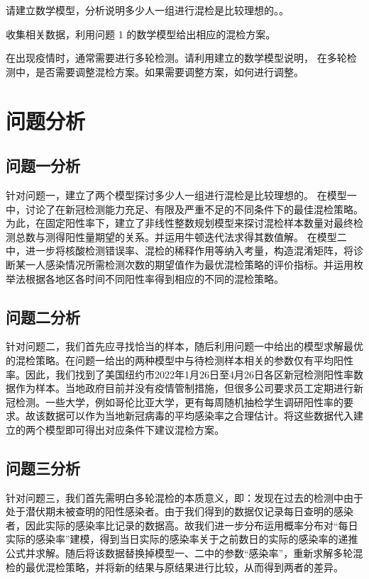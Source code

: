 \documentclass[withoutpreface,bwprint]{cumcmthesis} %
\begin{document}
 \begin{problem}
请建立数学模型，分析说明多少人一组进行混检是比较理想的。。
 \end{problem}
 \begin{problem}
收集相关数据，利用问题 1 的数学模型给出相应的混检方案。
 \end{problem}
 \begin{problem}
在出现疫情时，通常需要进行多轮检测。请利用建立的数学模型说明，
在多轮检测中，是否需要调整混检方案。如果需要调整方案，如何进行调整。
\end{problem}

\section{问题分析}
\subsection{问题一分析}
针对问题一，建立了两个模型探讨多少人一组进行混检是比较理想的。
在模型一中，讨论了在新冠检测能力充足、有限及严重不足的不同条件下的最佳混检策略。为此，在固定阳性率下，建立了非线性整数规划模型来探讨混检样本数量对最终检测总数与测得阳性量期望的关系。并运用牛顿迭代法求得其数值解。
在模型二中，进一步将核酸检测错误率、混检的稀释作用等纳入考量，构造混淆矩阵，将诊断某一人感染情况所需检测次数的期望值作为最优混检策略的评价指标。并运用枚举法根据各地区各时间不同阳性率得到相应的不同的混检策略。

\subsection{问题二分析}
针对问题二，我们首先应寻找恰当的样本，随后利用问题一中给出的模型求解最优的混检策略。在问题一给出的两种模型中与待检测样本相关的参数仅有平均阳性率。因此，我们找到了美国纽约市2022年1月26日至4月26日各区新冠检测阳性率数据作为样本。当地政府目前并没有疫情管制措施，但很多公司要求员工定期进行新冠检测。一些大学，例如哥伦比亚大学，更有每周随机抽检学生调研阳性率的要求\cite{columbia}。故该数据可以作为当地新冠病毒的平均感染率之合理估计。将这些数据代入建立的两个模型即可得出对应条件下建议混检方案。

\subsection{问题三分析}
针对问题三，我们首先需明白多轮混检的本质意义，即：发现在过去的检测中由于处于潜伏期未被查明的阳性感染者。由于我们得到的数据仅记录每日查明的感染者，因此实际的感染率比记录的数据高。故我们进一步分布运用概率分布对“每日实际的感染率”建模，得到当日实际的感染率关于之前数日的实际的感染率的递推公式并求解。随后将该数据替换掉模型一、二中的参数“感染率”，重新求解多轮混检的最优混检策略，并将新的结果与原结果进行比较，从而得到两者的差异。
\end{document}
